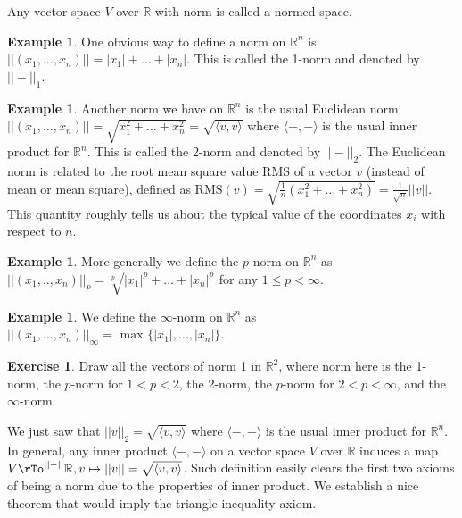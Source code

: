 \documentclass[12pt]{amsart}
\theoremstyle{definition}
\newtheorem{example}[theorem]{Example}
\newtheorem{exercise}[theorem]{Exercise}
\begin{document}
Any vector space $V$ over $\mathbb{R}$ with norm is called a normed space.

\begin{example} One obvious way to define a norm on $\mathbb{R}^n$ is $||(x_1, \dots, x_n)|| = |x_1| + \ldots + |x_n|$. This is called the 1-norm and denoted by $|| - ||_1$.
\end{example}

\begin{example} Another norm we have on $\mathbb{R}^n$ is the usual Euclidean norm $||(x_1, \dots, x_n)|| = \sqrt{x_1^2 + \ldots + x_n^2} = \sqrt{\langle v, v \rangle}$ where $\langle - , - \rangle$ is the usual inner product for $\mathbb{R}^n$. This is called the 2-norm and denoted by $|| - ||_2$. The Euclidean norm is related to the root mean square value RMS of a vector $v$ (instead of mean or mean square), defined as $\text{RMS}(v) = \sqrt{\frac{1}{n}(x_1^2 + \ldots + x_n^2)} = \frac{1}{\sqrt{n}} ||v||$. This quantity roughly tells us about the typical value of the coordinates $x_i$ with respect to $n$.
\end{example}

\begin{example} More generally we define the $p$-norm on $\mathbb{R}^n$ as $||(x_1,.., x_n)||_p = \sqrt[p]{|x_1|^p + \ldots + |x_n|^p}$ for any $1 \leq p < \infty$.
\end{example}

\begin{example} We define the $\infty$-norm on $\mathbb{R}^n$ as $||(x_1, \dots, x_n)||_{\infty} = \text{ max } \{|x_1|, \dots, |x_n|\}$.
\end{example}

\begin{exercise} Draw all the vectors of norm 1 in $\mathbb{R}^2$, where norm here is the 1-norm, the $p$-norm for $1 < p < 2$, the 2-norm, the $p$-norm for $2 < p < \infty$, and the $\infty$-norm.
\end{exercise}

We just saw that $||v||_2 = \sqrt{\langle v, v \rangle}$ where $\langle - , - \rangle$ is the usual inner product for $\mathbb{R}^n$. In general, any inner product $\langle  - , - \rangle$ on a vector space $V$ over $\mathbb{R}$ induces a map $V \rTo^{|| - ||} \mathbb{R}, v \mapsto ||v|| = \sqrt{ \langle v, v \rangle}$. Such definition easily clears the first two axioms of being a norm due to the properties of inner product. We establish a nice theorem that would imply the triangle inequality axiom.
\end{document}
